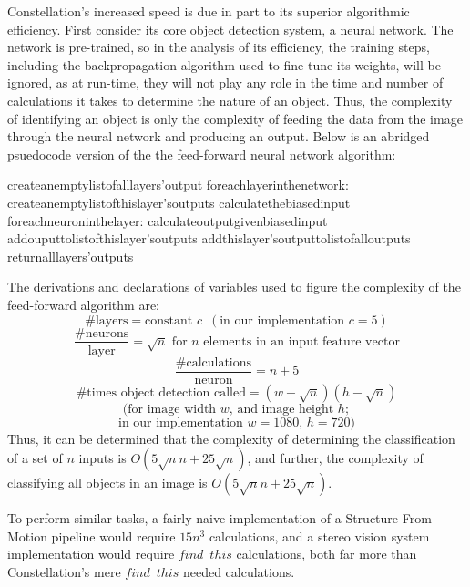Constellation's increased speed is due in part to its superior algorithmic efficiency. First consider its core object detection system, a neural network. The network is pre-trained, so in the analysis of its efficiency, the training steps, including the backpropagation algorithm used to fine tune its weights, will be ignored, as at run-time, they will not play any role in the time and number of calculations it takes to determine the nature of an object. Thus, the complexity of identifying an object is only the complexity of feeding the data from the image through the neural network and producing an output. Below is an abridged psuedocode version of the the feed-forward neural network algorithm:
\begin{program}
create\enspace an\enspace empty\enspace list\enspace of\enspace all\enspace layers'\enspace output
for\enspace each\enspace layer\enspace in\enspace the\enspace network:
\enspace\enspace	create\enspace an\enspace empty\enspace list\enspace of\enspace this\enspace layer's\enspace outputs
\enspace\enspace	calculate\enspace the\enspace biased\enspace input
\enspace\enspace	for\enspace each\enspace neuron\enspace in\enspace the\enspace layer:
\enspace\enspace\enspace\enspace		calculate\enspace output\enspace given\enspace biased\enspace input
\enspace\enspace\enspace\enspace		add\enspace ouput\enspace to\enspace list\enspace of\enspace this\enspace layer's\enspace outputs
\enspace\enspace	add\enspace this\enspace layer's\enspace output\enspace to\enspace list\enspace of\enspace all\enspace outputs
return\enspace all\enspace layers'\enspace outputs
\end{program}
The derivations and declarations of variables used to figure the complexity of the feed-forward algorithm are:
$$\text{\# layers}=\text{constant }c \enspace (\text{in our implementation }c=5)$$
$$\frac{\text{\# neurons}}{\text{layer}}=\sqrt{n}\text{ for $n$ elements in an input feature vector}$$
$$\frac{\text{\# calculations}}{\text{neuron}}=n+5$$
$$\text{\# times object detection called}=(w-\sqrt{n})(h-\sqrt{n})$$
$$\text{(for image width }w\text{, and image height }h;$$
$$\text{in our implementation }w=1080\text{, }h=720)$$
Thus, it can be determined that the complexity of determining the classification of a set of $n$ inputs is $O(5\sqrt{n}n+25\sqrt{n})$, and further, the complexity of classifying all objects in an image is $O(5\sqrt{n}n+25\sqrt{n})$. 

To perform similar tasks, a fairly naive implementation of a Structure-From-Motion pipeline would require $15n^3$ calculations, and a stereo vision system implementation would require $find\enspace this$ calculations, both far more than Constellation's mere $find\enspace this$ needed calculations.
